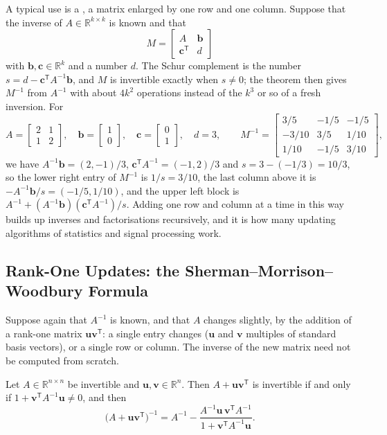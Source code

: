 A typical use is a , a matrix enlarged by one row and one column. Suppose that the inverse of $A\in\mathbb R^{k\times k}$ is known and that
\[
M=\begin{bmatrix}A&\mathbf b\\\mathbf c^{\mathsf T}&d\end{bmatrix}
\]
with $\mathbf b,\mathbf c\in\mathbb R^k$ and a number $d$. The Schur complement is the number $s=d-\mathbf c^{\mathsf T}A^{-1}\mathbf b$, and $M$ is invertible exactly when $s\ne0$; the theorem then gives $M^{-1}$ from $A^{-1}$ with about $4k^2$ operations instead of the $k^3$ or so of a fresh inversion. For
\[
A=\begin{bmatrix}2&1\\1&2\end{bmatrix},\quad\mathbf b=\begin{bmatrix}1\\0\end{bmatrix},\quad\mathbf c=\begin{bmatrix}0\\1\end{bmatrix},\quad d=3,\qquad M^{-1}=\begin{bmatrix}3/5&-1/5&-1/5\\-3/10&3/5&1/10\\1/10&-1/5&3/10\end{bmatrix},
\]
we have $A^{-1}\mathbf b=(2,-1)/3$, $\mathbf c^{\mathsf T}A^{-1}=(-1,2)/3$ and $s=3-(-1/3)=10/3$, so the lower right entry of $M^{-1}$ is $1/s=3/10$, the last column above it is $-A^{-1}\mathbf b/s=(-1/5,1/10)$, and the upper left block is $A^{-1}+(A^{-1}\mathbf b)(\mathbf c^{\mathsf T}A^{-1})/s$. Adding one row and column at a time in this way builds up inverses and factorisations recursively, and it is how many updating algorithms of statistics and signal processing work.

\subsection{Rank-One Updates: the Sherman--Morrison--Woodbury Formula}

Suppose again that $A^{-1}$ is known, and that $A$ changes slightly, by the addition of a rank-one matrix $\mathbf u\mathbf v^{\mathsf T}$: a single entry changes ($\mathbf u$ and $\mathbf v$ multiples of standard basis vectors), or a single row or column. The inverse of the new matrix need not be computed from scratch.

\begin{theorem}
\label{thm:sherman-morrison}
Let $A\in\mathbb R^{n\times n}$ be invertible and $\mathbf u,\mathbf v\in\mathbb R^n$. Then $A+\mathbf u\mathbf v^{\mathsf T}$ is invertible if and only if $1+\mathbf v^{\mathsf T}A^{-1}\mathbf u\ne0$, and then
\[
\bigl(A+\mathbf u\mathbf v^{\mathsf T}\bigr)^{-1}=A^{-1}-\frac{A^{-1}\mathbf u\,\mathbf v^{\mathsf T}A^{-1}}{1+\mathbf v^{\mathsf T}A^{-1}\mathbf u}.
\]
\end{theorem}

